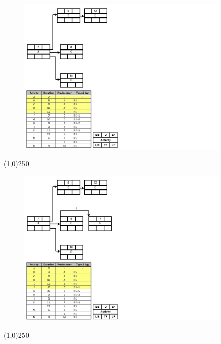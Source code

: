 \begin{frame}
\begin{figure}
	\centering
		\includegraphics[width = 10.0cm]{oldnotes/Slide192.jpg}
\end{figure}
\end{frame}
\begin{center}\line(1,0){250}\end{center}




\begin{frame}
\begin{figure}
	\centering
		\includegraphics[width = 10.0cm]{oldnotes/Slide193.jpg}
\end{figure}
\end{frame}
\begin{center}\line(1,0){250}\end{center}




